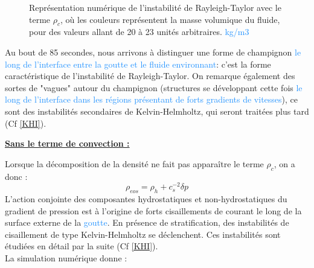 \documentclass{rapportECC}
\newcommand{\FAadd}[1]{\textcolor{DodgerBlue}{{#1}}}                     %
\begin{document}
\begin{figure}[htb]
    \centering
    \hfill
    \caption{Représentation numérique de l'instabilité de Rayleigh-Taylor avec le terme $\rho_c$, où les couleurs représentent la masse volumique du fluide, pour des valeurs allant de 20 à 23 unités arbitraires.  \FAadd{kg/m3}}
    \label{fig:images_cote_a_cote}
\end{figure}

Au bout de 85 secondes, nous arrivons à distinguer une forme de champignon \FAadd{le long de l'interface entre la goutte et le fluide environnant}: c'est la forme caractéristique de l'instabilité de Rayleigh-Taylor. On remarque également des sortes de "vagues" autour du champignon (structures se développant cette fois \FAadd{le long de l'interface dans les régions présentant de forts gradients de vitesses}), ce sont des instabilités secondaires de Kelvin-Helmholtz, qui seront traitées plus tard (Cf \ref{KHI}).


\vspace{1 cm}


\underline{\textbf{Sans le terme de convection :}} 
\label{sans rhoc}
\vspace{0.5 cm}

Lorsque la décomposition de la densité ne fait pas apparaître le terme $\rho_c$, on a donc :
\begin{equation}
    \rho_{eos} = \rho_h + c_s^{-2}\delta p
\end{equation}
L'action conjointe des composantes hydrostatiques et non-hydrostatiques du gradient de pression est à l'origine de forts cisaillements de courant le long de la surface externe de la \FAadd{goutte}. En présence de stratification, des instabilités de cisaillement de type Kelvin-Helmholtz se déclenchent. Ces instabilités sont étudiées en détail par la suite (Cf \ref{KHI}).
\\
La simulation numérique donne :
\end{document}
